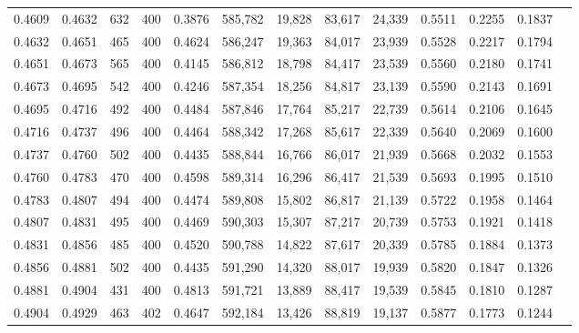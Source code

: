 \begin{tabular}{rrrrrrrrrrrrr}
0.4609 & 0.4632 &    632 &   400 &                                     0.3876 & 585,782 &  19,828 &  83,617 &  24,339 & 0.5511 & 0.2255 & 0.1837 \\
0.4632 & 0.4651 &    465 &   400 &                                     0.4624 & 586,247 &  19,363 &  84,017 &  23,939 & 0.5528 & 0.2217 & 0.1794 \\
0.4651 & 0.4673 &    565 &   400 &                                     0.4145 & 586,812 &  18,798 &  84,417 &  23,539 & 0.5560 & 0.2180 & 0.1741 \\
0.4673 & 0.4695 &    542 &   400 &                                     0.4246 & 587,354 &  18,256 &  84,817 &  23,139 & 0.5590 & 0.2143 & 0.1691 \\
0.4695 & 0.4716 &    492 &   400 &                                     0.4484 & 587,846 &  17,764 &  85,217 &  22,739 & 0.5614 & 0.2106 & 0.1645 \\
0.4716 & 0.4737 &    496 &   400 &                                     0.4464 & 588,342 &  17,268 &  85,617 &  22,339 & 0.5640 & 0.2069 & 0.1600 \\
0.4737 & 0.4760 &    502 &   400 &                                     0.4435 & 588,844 &  16,766 &  86,017 &  21,939 & 0.5668 & 0.2032 & 0.1553 \\
0.4760 & 0.4783 &    470 &   400 &                                     0.4598 & 589,314 &  16,296 &  86,417 &  21,539 & 0.5693 & 0.1995 & 0.1510 \\
0.4783 & 0.4807 &    494 &   400 &                                     0.4474 & 589,808 &  15,802 &  86,817 &  21,139 & 0.5722 & 0.1958 & 0.1464 \\
0.4807 & 0.4831 &    495 &   400 &                                     0.4469 & 590,303 &  15,307 &  87,217 &  20,739 & 0.5753 & 0.1921 & 0.1418 \\
0.4831 & 0.4856 &    485 &   400 &                                     0.4520 & 590,788 &  14,822 &  87,617 &  20,339 & 0.5785 & 0.1884 & 0.1373 \\
0.4856 & 0.4881 &    502 &   400 &                                     0.4435 & 591,290 &  14,320 &  88,017 &  19,939 & 0.5820 & 0.1847 & 0.1326 \\
0.4881 & 0.4904 &    431 &   400 &                                     0.4813 & 591,721 &  13,889 &  88,417 &  19,539 & 0.5845 & 0.1810 & 0.1287 \\
0.4904 & 0.4929 &    463 &   402 &                                     0.4647 & 592,184 &  13,426 &  88,819 &  19,137 & 0.5877 & 0.1773 & 0.1244 \\

\end{tabular}
